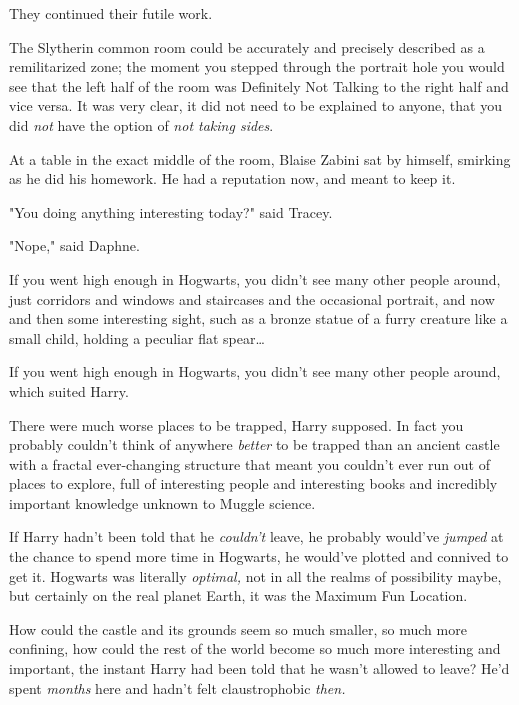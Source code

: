They continued their futile work.

The Slytherin common room could be accurately and precisely described as a
remilitarized zone; the moment you stepped through the portrait hole you would
see that the left half of the room was Definitely Not Talking to the right half
and vice versa. It was very clear, it did not need to be explained to anyone,
that you did \emph{not} have the option of \emph{not taking sides}.

At a table in the exact middle of the room, Blaise Zabini sat by himself,
smirking as he did his homework. He had a reputation now, and meant to keep it.

"You doing anything interesting today?" said Tracey.

"Nope," said Daphne.

If you went high enough in Hogwarts, you didn't see many other people around,
just corridors and windows and staircases and the occasional portrait, and now
and then some interesting sight, such as a bronze statue of a furry creature
like a small child, holding a peculiar flat spear…

If you went high enough in Hogwarts, you didn't see many other people around,
which suited Harry.

There were much worse places to be trapped, Harry supposed. In fact you
probably couldn't think of anywhere \emph{better} to be trapped than an ancient
castle with a fractal ever-changing structure that meant you couldn't ever run
out of places to explore, full of interesting people and interesting books and
incredibly important knowledge unknown to Muggle science.

If Harry hadn't been told that he \emph{couldn't} leave, he probably would've
\emph{jumped} at the chance to spend more time in Hogwarts, he would've plotted
and connived to get it. Hogwarts was literally \emph{optimal,} not in all the
realms of possibility maybe, but certainly on the real planet Earth, it was the
Maximum Fun Location.

How could the castle and its grounds seem so much smaller, so much more
confining, how could the rest of the world become so much more interesting and
important, the instant Harry had been told that he wasn't allowed to leave?
He'd spent \emph{months} here and hadn't felt claustrophobic \emph{then.}

